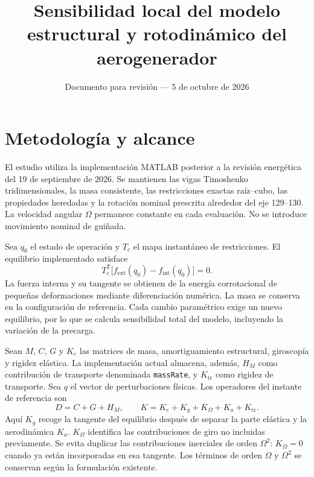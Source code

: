 \documentclass[11pt,a4paper]{article}
\title{Sensibilidad local del modelo estructural y rotodinámico del aerogenerador}
\author{}
\date{Documento para revisión --- 5 de octubre de 2026}
\begin{document}
\maketitle

\section{Metodología y alcance}
El estudio utiliza la implementación MATLAB posterior a la revisión energética del 19 de septiembre de 2026. Se mantienen las vigas Timoshenko tridimensionales, la masa consistente, las restricciones exactas raíz--cubo, las propiedades heredadas y la rotación nominal prescrita alrededor del eje 129--130. La velocidad angular $\Omega$ permanece constante en cada evaluación. No se introduce movimiento nominal de guiñada.

Sea $q_0$ el estado de operación y $T_c$ el mapa instantáneo de restricciones. El equilibrio implementado satisface
\begin{equation}
T_c^{\mathsf T}\bigl[f_{\mathrm{ext}}(q_0)-f_{\mathrm{int}}(q_0)\bigr]=0.
\end{equation}
La fuerza interna y su tangente se obtienen de la energía corrotacional de pequeñas deformaciones mediante diferenciación numérica. La masa se conserva en la configuración de referencia. Cada cambio paramétrico exige un nuevo equilibrio, por lo que se calcula sensibilidad total del modelo, incluyendo la variación de la precarga.

Sean $M$, $C$, $G$ y $K_e$ las matrices de masa, amortiguamiento estructural, giroscopía y rigidez elástica. La implementación actual almacena, además, $H_M$ como contribución de transporte denominada \texttt{massRate}, y $K_{\mathrm{tr}}$ como rigidez de transporte. Sea $q$ el vector de perturbaciones físicas. Los operadores del instante de referencia son
\begin{equation}
D=C+G+H_M,\qquad
K=K_e+K_g+K_\Omega+K_a+K_{\mathrm{tr}}.
\end{equation}
Aquí $K_g$ recoge la tangente del equilibrio después de separar la parte elástica y la aerodinámica $K_a$. $K_\Omega$ identifica las contribuciones de giro no incluidas previamente. Se evita duplicar las contribuciones inerciales de orden $\Omega^2$: $K_\Omega=0$ cuando ya están incorporadas en esa tangente. Los términos de orden $\Omega$ y $\Omega^2$ se conservan según la formulación existente.
\end{document}

